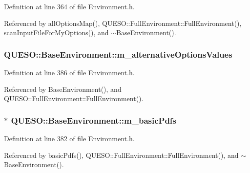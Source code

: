 Definition at line 364 of file Environment.\-h.



Referenced by all\-Options\-Map(), Q\-U\-E\-S\-O\-::\-Full\-Environment\-::\-Full\-Environment(), scan\-Input\-File\-For\-My\-Options(), and $\sim$\-Base\-Environment().

\hypertarget{class_q_u_e_s_o_1_1_base_environment_a38f945c0c2e4d90a550b06a341cc2c7d}{
\subsubsection[{m\-\_\-alternative\-Options\-Values}]{ Q\-U\-E\-S\-O\-::\-Base\-Environment\-::m\-\_\-alternative\-Options\-Values\hspace{0.3cm}{\ttfamily [protected]}}}\label{class_q_u_e_s_o_1_1_base_environment_a38f945c0c2e4d90a550b06a341cc2c7d}


Definition at line 386 of file Environment.\-h.



Referenced by Base\-Environment(), and Q\-U\-E\-S\-O\-::\-Full\-Environment\-::\-Full\-Environment().

\hypertarget{class_q_u_e_s_o_1_1_base_environment_a43b3045235a87236f0adc7df3427adc0}{
\subsubsection[{m\-\_\-basic\-Pdfs}]{$\ast$ Q\-U\-E\-S\-O\-::\-Base\-Environment\-::m\-\_\-basic\-Pdfs\hspace{0.3cm}{\ttfamily [protected]}}}\label{class_q_u_e_s_o_1_1_base_environment_a43b3045235a87236f0adc7df3427adc0}


Definition at line 382 of file Environment.\-h.



Referenced by basic\-Pdfs(), Q\-U\-E\-S\-O\-::\-Full\-Environment\-::\-Full\-Environment(), and $\sim$\-Base\-Environment().

